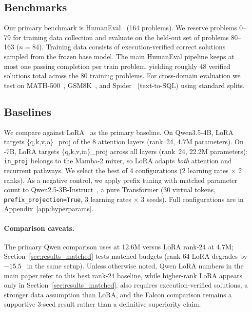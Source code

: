 \documentclass{article}
\begin{document}
\subsection{Benchmarks}
\label{sec:setup_benchmarks}

Our primary benchmark is HumanEval~\cite{humaneval} (164 problems). We reserve
problems 0--79 for training data collection and evaluate on the held-out set of
problems 80--163 ($n{=}84$). Training data consists of execution-verified
correct solutions sampled from the frozen base model. The main HumanEval
pipeline keeps at most one passing completion per train problem, yielding
roughly 48 verified solutions total across the 80 training problems. For
cross-domain evaluation we test on MATH-500~\cite{math500},
GSM8K~\cite{gsm8k}, and Spider~\cite{spider} (text-to-SQL) using standard splits.

\subsection{Baselines}
\label{sec:setup_baselines}

We compare against LoRA~\cite{lora} as the primary baseline. On Qwen3.5-4B,
LoRA targets $\{$q,k,v,o$\}$\_proj of the 8 attention layers (rank~24, 4.7M
parameters). On \falcon-7B, LoRA targets $\{$q,k,v,in$\}$\_proj across all
layers (rank~24, 22.2M parameters); \texttt{in\_proj} belongs to the Mamba-2
mixer, so \falcon LoRA adapts \emph{both} attention and recurrent pathways. We
select the best of 4 configurations (2 learning rates $\times$ 2 ranks).
As a negative control, we apply prefix tuning with matched parameter count to
Qwen2.5-3B-Instruct~\cite{qwen2_5}, a pure Transformer (30 virtual tokens,
\texttt{prefix\_projection=True}, 3 learning rates $\times$ 3 seeds).
Full configurations are in Appendix~\ref{app:hyperparams}.

\paragraph{Comparison caveats.}
The primary Qwen comparison uses \methodshort at 12.6M versus LoRA rank-24 at
4.7M; Section~\ref{sec:results_matched} tests matched budgets (rank-64 LoRA
degrades by $-15.5$~\pp{} in the same setup). Unless otherwise noted, Qwen
LoRA numbers in the main paper refer to this best rank-24 baseline, while
higher-rank LoRA appears only in Section~\ref{sec:results_matched}.
\methodshort also requires execution-verified solutions, a stronger data
assumption than LoRA, and the Falcon comparison remains a supportive 3-seed
result rather than a definitive superiority claim.
\end{document}
